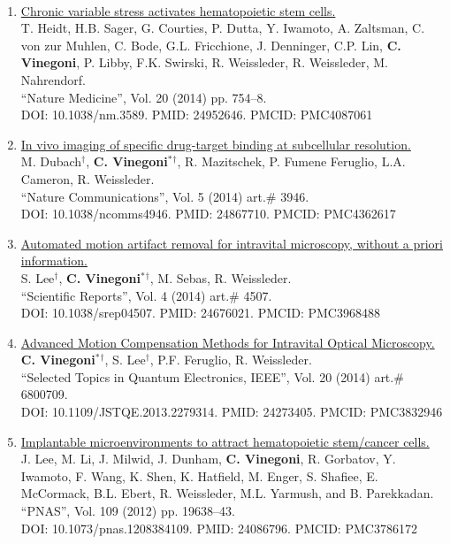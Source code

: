 \documentclass{resume}
\begin{document}
\begin{category}{~~}
\begin{enumerate}
\item
\href{https://tinyurl.com/2z2fdum5}{Chronic variable stress activates hematopoietic stem cells.}\\
T. Heidt, H.B. Sager, G. Courties, P. Dutta, Y. Iwamoto, A. Zaltsman, C. von zur Muhlen, C. Bode, G.L. Fricchione, J. Denninger, C.P. Lin,  {\bf C. Vinegoni}, P. Libby, F.K. Swirski, R. Weissleder, R. Weissleder, M. Nahrendorf. \\
 ``Nature Medicine'', Vol. 20 (2014) pp. 754--8. \\DOI: 10.1038/nm.3589. PMID: 24952646. PMCID: PMC4087061 

\item
\href{https://tinyurl.com/j2288nha}{In vivo imaging of specific drug-target binding at subcellular resolution.}\\
M. Dubach{$^\dag$}, {\bf C. Vinegoni$^*${$^\dag$}},  R. Mazitschek, P. Fumene Feruglio, L.A. Cameron, R. Weissleder. \\
 ``Nature Communications'', Vol. 5 (2014) art.$\#$ 3946. \\DOI: 10.1038/ncomms4946. PMID: 24867710. PMCID: PMC4362617 

\item
\href{https://tinyurl.com/yysfh9mj}{Automated motion artifact removal for intravital microscopy, without a priori information.}\\
 S. Lee{$^\dag$}, {\bf C. Vinegoni$^*${$^\dag$}},  M. Sebas, R. Weissleder. \\
 ``Scientific Reports'', Vol. 4 (2014) art.$\#$ 4507. \\DOI: 10.1038/srep04507. PMID: 24676021. PMCID: PMC3968488 

\item
\href{https://tinyurl.com/347m34a9}{Advanced Motion Compensation Methods for Intravital Optical Microscopy.}\\
 {\bf C. Vinegoni$^*${$^\dag$}},  S. Lee{$^\dag$}, P.F. Feruglio, R. Weissleder. \\
 ``Selected Topics in Quantum Electronics, IEEE'', Vol. 20 (2014) art.$\#$ 6800709. \\DOI: 10.1109/JSTQE.2013.2279314. PMID: 24273405. PMCID: PMC3832946 

\item
\href{https://tinyurl.com/k4wuk5zp}{Implantable microenvironments to attract hematopoietic stem/cancer cells.}\\
J. Lee, M. Li, J. Milwid, J. Dunham, {\bf C. Vinegoni}, R. Gorbatov, Y. Iwamoto, F. Wang, K. Shen, K. Hatfield, M. Enger, S. Shafiee, E. McCormack, B.L. Ebert, R. Weissleder, M.L. Yarmush, and B. Parekkadan.\\
 ``PNAS'', Vol. 109 (2012) pp. 19638--43. \\DOI: 10.1073/pnas.1208384109. PMID: 24086796. PMCID: PMC3786172 


\end{enumerate}
\end{category}
\end{document}

